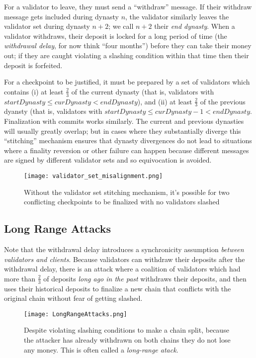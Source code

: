 \documentclass[12pt, final]{article}
\begin{document}
For a validator to leave, they must send a ``withdraw'' message. If their withdraw message gets included during dynasty $n$, the validator similarly leaves the validator set during dynasty $n+2$; we call $n+2$ their \textit{end dynasty}. When a validator withdraws, their deposit is locked for a long period of time (the \textit{withdrawal delay}, for now think ``four months'') before they can take their money out; if they are caught violating a slashing condition within that time then their deposit is forfeited.

For a checkpoint to be justified, it must be prepared by a set of validators which contains (i) at least $\frac{2}{3}$ of the current dynasty (that is, validators with $startDynasty \le curDynasty < endDynasty$), and (ii) at least $\frac{2}{3}$ of the previous dyansty (that is, validators with $startDynasty \le curDynasty - 1 < endDynasty$. Finalization with commits works similarly. The current and previous dynasties will usually greatly overlap; but in cases where they substantially diverge this ``stitching'' mechanism ensures that dynasty divergences do not lead to situations where a finality reversion or other failure can happen because different messages are signed by different validator sets and so equivocation is avoided.

\begin{figure}[h!tb]
\centering
\texttt{[image: validator\_set\_misalignment.png]}
\caption{Without the validator set stitching mechanism, it's possible for two conflicting checkpoints to be finalized with no validators slashed}
\label{fig:dynamic2}
\end{figure}

\subsection{Long Range Attacks}

Note that the withdrawal delay introduces a synchronicity assumption \textit{between validators and clients}. Because validators can withdraw their deposits after the withdrawal delay, there is an attack where a coalition of validators which had more than $\frac{2}{3}$ of deposits \textit{long ago in the past} withdraws their deposits, and then uses their historical deposits to finalize a new chain that conflicts with the original chain without fear of getting slashed.

\begin{figure}
\centering
\texttt{[image: LongRangeAttacks.png]}
\caption{Despite violating slashing conditions to make a chain split, because the attacker has already withdrawn on both chains they do not lose any money. This is often called a \textit{long-range atack}.}
\label{fig:dynamic3}
\end{figure}
\end{document}
